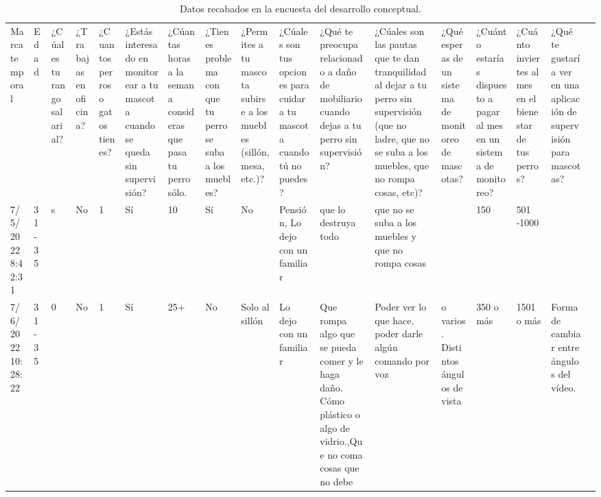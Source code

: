 \begin{landscape}
\begin{table}
  \label{tab:encuestas}
  \caption{Datos recabados en la encuesta del desarrollo conceptual.}
  \tiny
  \begin{tabular}{
        p{0.059\lanscapetablewidth}p{0.022\lanscapetablewidth}
        p{0.056\lanscapetablewidth}p{0.010\lanscapetablewidth}
        p{0.016\lanscapetablewidth}p{0.018\lanscapetablewidth}
        p{0.03\lanscapetablewidth}p{0.02\lanscapetablewidth}
        p{0.03\lanscapetablewidth}p{0.086\lanscapetablewidth}
        p{0.108\lanscapetablewidth}p{0.125\lanscapetablewidth}
        p{0.149\lanscapetablewidth}p{0.024\lanscapetablewidth}
        p{0.041\lanscapetablewidth}p{0.206\lanscapetablewidth}
        p{0.059\lanscapetablewidth}
    }
    \cline{1-16}
    Marca temporal & Edad & ¿Cúal es tu rango salarial? & 
    ¿Trabajas en oficina? & ¿Cuantos perros o gatos tienes? & 
    ¿Estás interesado en monitorear a tu mascota cuando se queda sin supervisión? & 
    ¿Cúantas horas a la semana consideras que pasa tu perro sólo. & 
    ¿Tienes problema con que tu perro se suba a los muebles? & 
    ¿Permites a tu mascota subirse a los muebles (sillón, mesa, etc.)? & 
    ¿Cúales son tus opciones para cuidar a tu mascota cuando tú no puedes? & 
    ¿Qué te preocupa relacionado a daño de mobiliario cuando dejas a tu perro sin supervisión? & 
    ¿Cúales son las pautas que te dan tranquilidad al dejar a tu perro sin supervisión (que no ladre, que no se suba a los muebles, que no rompa cosas, etc)? & 
    ¿Qué esperas de un sistema de monitoreo de mascotas? & 
    ¿Cuánto estarías dispuesto a pagar al mes en un sistema de monitoreo? & ¿Cuánto inviertes al mes en el bienestar de tus perros? & 
    ¿Qué te gustaría ver en una aplicación de supervisión para mascotas? & \parbox[t]{2mm}{} \\
    7/5/2022 8:42:31 & 31-35 & s & No & 1 & Sí & 10 & Sí & No & Pensión, Lo dejo con un familiar & que lo destruya todo & que no se suba a los muebles y que no rompa cosas  &  & 150 & 501 -1000 & &\\
    7/6/2022 10:28:22 & 31-35 & 0 & No & 1 & Sí & 25+ & No & Solo al sillón & Lo dejo con un familiar & Que rompa algo que se pueda comer y le haga daño. Cómo plástico o algo de vidrio.,Que no coma cosas que no debe & Poder ver lo que hace, poder darle algún comando por voz &  o varios. Distintos ángulos de vista & 350 o más & 1501 o más & Forma de cambiar entre ángulos del vídeo. & \\

\end{tabular}
\end{table}
\end{landscape}
